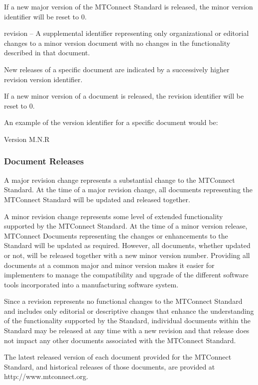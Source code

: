 If a new \gls{major} version of the MTConnect Standard is released, the \gls{minor} version identifier will be reset to 0.

\gls{revision} -- A supplemental identifier representing only organizational or editorial changes to a \gls{minor} version document with no changes in the functionality described in that document.

New releases of a specific document are indicated by a successively higher revision version identifier.

If a new \gls{minor} version of a document is released, the \gls{revision} identifier will be reset to 0.
                                                                                                                     
An example of the version identifier for a specific document would be: 

\centerline{Version M.N.R}

\subsubsection{Document Releases}

A \gls{major} revision change represents a substantial change to the MTConnect Standard.  At the time of a \gls{major} revision change, all documents representing the MTConnect Standard will be updated and released together.

A \gls{minor} revision change represents some level of extended functionality supported by the MTConnect Standard.  At the time of a \gls{minor} version release, MTConnect Documents representing the changes or enhancements to the Standard will be updated as required. However, all documents, whether updated or not, will be released together with a new \gls{minor} version number.  Providing all documents at a common \gls{major} and \gls{minor} version makes it easier for implementers to manage the compatibility and upgrade of the different software tools incorporated into a manufacturing software system.

Since a \gls{revision} represents no functional changes to the MTConnect Standard and includes only editorial or descriptive changes that enhance the understanding of the functionality supported by the Standard, individual documents within the Standard may be released at any time with a new \gls{revision} and that release does not impact any other documents associated with the MTConnect Standard.

The latest released version of each document provided for the MTConnect Standard, and historical releases of those documents, are provided at http://www.mtconnect.org.

